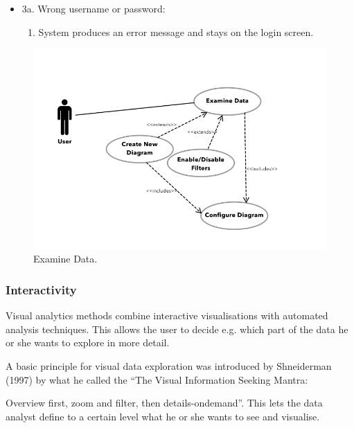 \documentclass[twoside, english, draft]{Pflichtenheft}
\begin{document}
\begin{description}
\begin{description}
\begin{itemize}
			            \item[]3a. Wrong username or password:
			                  \begin{enumerate}
				                  \item{System produces an error message and stays on the login screen.}
			                  \end{enumerate}

		            \end{itemize}
	      \end{description}

	      \begin{figure}[h]
		      \centering
		      \includegraphics[width=\textwidth]{Images/case_examine_data.png}
		      \caption{Examine Data.}
	      \end{figure}
\end{description}


\subsubsection{Interactivity}

Visual analytics methods combine interactive visualisations with automated analysis
techniques. This allows the user to decide e.g. which part
of the data he or she wants to explore in more detail.

A basic principle for visual data exploration was introduced by Shneiderman (1997) by what he called the “The Visual Information Seeking Mantra:

Overview first, zoom and filter, then details-ondemand”.
This lets the data analyst define to a certain level what he or she wants
to see and visualise.
\end{document}
